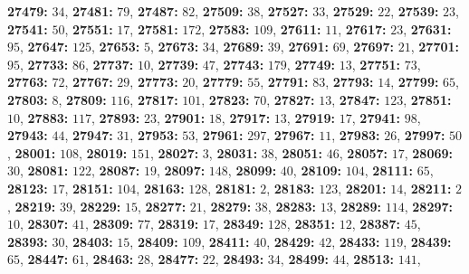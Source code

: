 \textsf{\bfseries 27479:} $34$, \textsf{\bfseries 27481:} $79$, \textsf{\bfseries 27487:} $82$, \textsf{\bfseries 27509:} $38$, \textsf{\bfseries 27527:} $33$, \textsf{\bfseries 27529:} $22$, \textsf{\bfseries 27539:} $23$, \textsf{\bfseries 27541:} $50$, \textsf{\bfseries 27551:} $17$, \textsf{\bfseries 27581:} $172$, \textsf{\bfseries 27583:} $109$, \textsf{\bfseries 27611:} $11$, \textsf{\bfseries 27617:} $23$, \textsf{\bfseries 27631:} $95$, \textsf{\bfseries 27647:} $125$, \textsf{\bfseries 27653:} $5$, \textsf{\bfseries 27673:} $34$, \textsf{\bfseries 27689:} $39$, \textsf{\bfseries 27691:} $69$, \textsf{\bfseries 27697:} $21$, \textsf{\bfseries 27701:} $95$, \textsf{\bfseries 27733:} $86$, \textsf{\bfseries 27737:} $10$, \textsf{\bfseries 27739:} $47$, \textsf{\bfseries 27743:} $179$, \textsf{\bfseries 27749:} $13$, \textsf{\bfseries 27751:} $73$, \textsf{\bfseries 27763:} $72$, \textsf{\bfseries 27767:} $29$, \textsf{\bfseries 27773:} $20$, \textsf{\bfseries 27779:} $55$, \textsf{\bfseries 27791:} $83$, \textsf{\bfseries 27793:} $14$, \textsf{\bfseries 27799:} $65$, \textsf{\bfseries 27803:} $8$, \textsf{\bfseries 27809:} $116$, \textsf{\bfseries 27817:} $101$, \textsf{\bfseries 27823:} $70$, \textsf{\bfseries 27827:} $13$, \textsf{\bfseries 27847:} $123$, \textsf{\bfseries 27851:} $10$, \textsf{\bfseries 27883:} $117$, \textsf{\bfseries 27893:} $23$, \textsf{\bfseries 27901:} $18$, \textsf{\bfseries 27917:} $13$, \textsf{\bfseries 27919:} $17$, \textsf{\bfseries 27941:} $98$, \textsf{\bfseries 27943:} $44$, \textsf{\bfseries 27947:} $31$, \textsf{\bfseries 27953:} $53$, \textsf{\bfseries 27961:} $297$, \textsf{\bfseries 27967:} $11$, \textsf{\bfseries 27983:} $26$, \textsf{\bfseries 27997:} $50$, \textsf{\bfseries 28001:} $108$, \textsf{\bfseries 28019:} $151$, \textsf{\bfseries 28027:} $3$, \textsf{\bfseries 28031:} $38$, \textsf{\bfseries 28051:} $46$, \textsf{\bfseries 28057:} $17$, \textsf{\bfseries 28069:} $30$, \textsf{\bfseries 28081:} $122$, \textsf{\bfseries 28087:} $19$, \textsf{\bfseries 28097:} $148$, \textsf{\bfseries 28099:} $40$, \textsf{\bfseries 28109:} $104$, \textsf{\bfseries 28111:} $65$, \textsf{\bfseries 28123:} $17$, \textsf{\bfseries 28151:} $104$, \textsf{\bfseries 28163:} $128$, \textsf{\bfseries 28181:} $2$, \textsf{\bfseries 28183:} $123$, \textsf{\bfseries 28201:} $14$, \textsf{\bfseries 28211:} $2$, \textsf{\bfseries 28219:} $39$, \textsf{\bfseries 28229:} $15$, \textsf{\bfseries 28277:} $21$, \textsf{\bfseries 28279:} $38$, \textsf{\bfseries 28283:} $13$, \textsf{\bfseries 28289:} $114$, \textsf{\bfseries 28297:} $10$, \textsf{\bfseries 28307:} $41$, \textsf{\bfseries 28309:} $77$, \textsf{\bfseries 28319:} $17$, \textsf{\bfseries 28349:} $128$, \textsf{\bfseries 28351:} $12$, \textsf{\bfseries 28387:} $45$, \textsf{\bfseries 28393:} $30$, \textsf{\bfseries 28403:} $15$, \textsf{\bfseries 28409:} $109$, \textsf{\bfseries 28411:} $40$, \textsf{\bfseries 28429:} $42$, \textsf{\bfseries 28433:} $119$, \textsf{\bfseries 28439:} $65$, \textsf{\bfseries 28447:} $61$, \textsf{\bfseries 28463:} $28$, \textsf{\bfseries 28477:} $22$, \textsf{\bfseries 28493:} $34$, \textsf{\bfseries 28499:} $44$, \textsf{\bfseries 28513:} $141$, 
